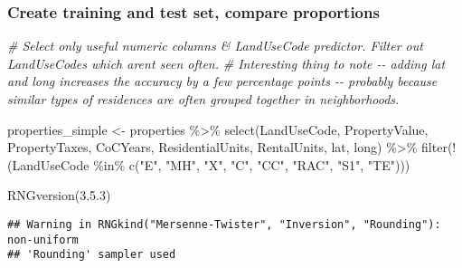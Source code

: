 \documentclass[
]{article}
\newenvironment{Shaded}{\begin{snugshade}}{\end{snugshade}}
\newcommand{\CommentTok}[1]{\textcolor[rgb]{0.56,0.35,0.01}{\textit{#1}}}
\newcommand{\DecValTok}[1]{\textcolor[rgb]{0.00,0.00,0.81}{#1}}
\newcommand{\FunctionTok}[1]{\textcolor[rgb]{0.00,0.00,0.00}{#1}}
\newcommand{\NormalTok}[1]{#1}
\newcommand{\OtherTok}[1]{\textcolor[rgb]{0.56,0.35,0.01}{#1}}
\newcommand{\SpecialCharTok}[1]{\textcolor[rgb]{0.00,0.00,0.00}{#1}}
\newcommand{\StringTok}[1]{\textcolor[rgb]{0.31,0.60,0.02}{#1}}
\begin{document}
\hypertarget{create-training-and-test-set-compare-proportions}{%
\subsubsection{Create training and test set, compare
proportions}\label{create-training-and-test-set-compare-proportions}}

\begin{Shaded}
\begin{Highlighting}[]
\CommentTok{\# Select only useful numeric columns \& LandUseCode predictor. Filter out LandUseCodes which aren\textquotesingle{}t seen often.}
\CommentTok{\# Interesting thing to note {-}{-} adding lat and long increases the accuracy by a few percentage points {-}{-} probably because similar types of residences are often grouped together in neighborhoods.}

\NormalTok{properties\_simple }\OtherTok{\textless{}{-}}\NormalTok{ properties }\SpecialCharTok{\%\textgreater{}\%} \FunctionTok{select}\NormalTok{(LandUseCode, PropertyValue, PropertyTaxes, CoCYears, ResidentialUnits, RentalUnits, lat, long) }\SpecialCharTok{\%\textgreater{}\%} \FunctionTok{filter}\NormalTok{(}\SpecialCharTok{!}\NormalTok{(LandUseCode }\SpecialCharTok{\%in\%} \FunctionTok{c}\NormalTok{(}\StringTok{"E"}\NormalTok{, }\StringTok{"MH"}\NormalTok{, }\StringTok{"X"}\NormalTok{, }\StringTok{"C"}\NormalTok{, }\StringTok{"CC"}\NormalTok{, }\StringTok{"RAC"}\NormalTok{, }\StringTok{"S1"}\NormalTok{, }\StringTok{"TE"}\NormalTok{)))}

\FunctionTok{RNGversion}\NormalTok{(}\StringTok{\textquotesingle{}3.5.3\textquotesingle{}}\NormalTok{)}
\end{Highlighting}
\end{Shaded}

\begin{verbatim}
## Warning in RNGkind("Mersenne-Twister", "Inversion", "Rounding"): non-uniform
## 'Rounding' sampler used
\end{verbatim}

\begin{Shaded}
\end{Shaded}
\end{document}
